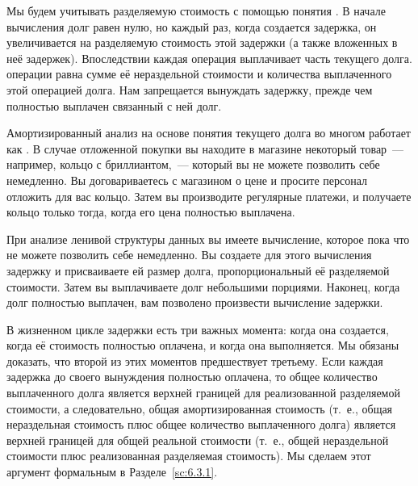 Мы будем учитывать разделяемую стоимость с помощью понятия
.  В начале вычисления долг
равен нулю, но каждый раз, когда создается задержка, он увеличивается
на разделяемую стоимость этой задержки (а также вложенных в неё
задержек). Впоследствии каждая операция выплачивает часть текущего
долга.  операции
равна сумме её нераздельной стоимости и количества выплаченного этой
операцией долга. Нам запрещается вынуждать задержку, прежде чем
полностью выплачен связанный с ней долг.

\begin{remark}
  Амортизированный анализ на основе понятия текущего долга во многом
  работает как . В случае
  отложенной покупки вы находите в магазине некоторый товар~---
  например, кольцо с бриллиантом,~--- который вы не можете позволить себе
  немедленно. Вы договариваетесь с магазином о цене и просите персонал
  отложить для вас кольцо. Затем вы производите регулярные платежи, и
  получаете кольцо только тогда, когда его цена полностью выплачена.

  При анализе ленивой структуры данных вы имеете вычисление, которое
  пока что не можете позволить себе немедленно. Вы создаете для этого
  вычисления задержку и присваиваете ей размер долга, пропорциональный
  её разделяемой стоимости. Затем вы выплачиваете долг небольшими
  порциями. Наконец, когда долг полностью выплачен, вам позволено
  произвести вычисление задержки.
\end{remark}

В жизненном цикле задержки есть три важных момента: когда она
создается, когда её стоимость полностью оплачена, и когда она
выполняется. Мы обязаны доказать, что второй из этих моментов
предшествует третьему.  Если каждая задержка до своего вынуждения
полностью оплачена, то общее количество выплаченного долга является
верхней границей для реализованной разделяемой стоимости, а
следовательно, общая амортизированная стоимость (т.~е., общая
нераздельная стоимость плюс общее количество выплаченного долга)
является верхней границей для общей реальной стоимости (т.~е., общей
нераздельной стоимости плюс реализованная разделяемая стоимость). Мы
сделаем этот аргумент формальным в Разделе~\ref{sc:6.3.1}.

